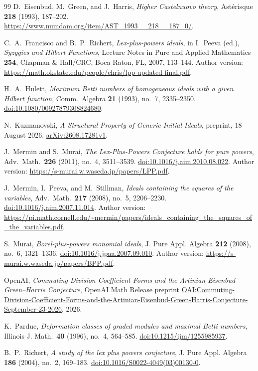 \begin{thebibliography}{99}
D.~Eisenbud, M.~Green, and J.~Harris,
\emph{Higher Castelnuovo theory},
Ast\'erisque \textbf{218} (1993), 187--202.
\url{https://www.numdam.org/item/AST_1993__218__187_0/}.

C.~A.~Francisco and B.~P.~Richert,
\emph{Lex-plus-powers ideals},
in I.~Peeva (ed.), \emph{Syzygies and Hilbert Functions},
Lecture Notes in Pure and Applied Mathematics \textbf{254},
Chapman \& Hall/CRC, Boca Raton, FL, 2007, 113--144.
Author version:
\url{https://math.okstate.edu/people/chris/lpp-updated-final.pdf}.

H.~A.~Hulett,
\emph{Maximum Betti numbers of homogeneous ideals with a given Hilbert function},
Comm.\ Algebra \textbf{21} (1993), no.~7, 2335--2350.
\href{https://doi.org/10.1080/00927879308824680}{doi:10.1080/00927879308824680}.

N.~Kuzmanovski,
\emph{A Structural Property of Generic Initial Ideals},
preprint, 18 August 2026.
\href{https://arxiv.org/abs/2608.17281v1}{arXiv:2608.17281v1}.

J.~Mermin and S.~Murai,
\emph{The Lex-Plus-Powers Conjecture holds for pure powers},
Adv.\ Math.\ \textbf{226} (2011), no.~4, 3511--3539.
\href{https://doi.org/10.1016/j.aim.2010.08.022}{doi:10.1016/j.aim.2010.08.022}.
Author version: \url{https://s-murai.w.waseda.jp/papers/LPP.pdf}.

J.~Mermin, I.~Peeva, and M.~Stillman,
\emph{Ideals containing the squares of the variables},
Adv.\ Math.\ \textbf{217} (2008), no.~5, 2206--2230.
\href{https://doi.org/10.1016/j.aim.2007.11.014}{doi:10.1016/j.aim.2007.11.014}.
Author version:
\url{https://pi.math.cornell.edu/~mermin/papers/ideals_containing_the_squares_of_the_variables.pdf}.

S.~Murai,
\emph{Borel-plus-powers monomial ideals},
J. Pure Appl. Algebra \textbf{212} (2008), no.~6, 1321--1336.
\href{https://doi.org/10.1016/j.jpaa.2007.09.010}{doi:10.1016/j.jpaa.2007.09.010}.
Author version: \url{https://s-murai.w.waseda.jp/papers/BPP.pdf}.

OpenAI,
\emph{Commuting Division-Coefficient Forms and the Artinian
Eisenbud--Green--Harris Conjecture},
OpenAI Math Release preprint
\href{https://github.com/openai/math/blob/main/preprints/Commuting-Division-Coefficient-Forms-and-the-Artinian-Eisenbud-Green-Harris-Conjecture-September-23-2026/paper.pdf}{OAI:Commuting-Division-Coefficient-Forms-and-the-Artinian-Eisenbud-Green-Harris-Conjecture-September-23-2026},
2026.

\enlargethispage{2\baselineskip}
K.~Pardue,
\emph{Deformation classes of graded modules and maximal Betti numbers},
Illinois J. Math.\ \textbf{40} (1996), no.~4, 564--585.
\href{https://doi.org/10.1215/ijm/1255985937}{doi:10.1215/ijm/1255985937}.

B.~P.~Richert,
\emph{A study of the lex plus powers conjecture},
J. Pure Appl. Algebra \textbf{186} (2004), no.~2, 169--183.
\href{https://doi.org/10.1016/S0022-4049(03)00130-0}{doi:10.1016/S0022-4049(03)00130-0}.
\end{thebibliography}
